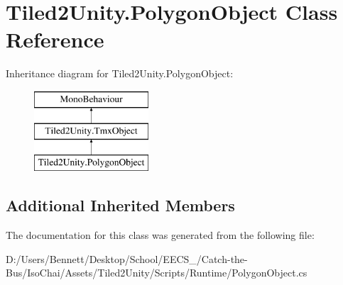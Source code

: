 \hypertarget{class_tiled2_unity_1_1_polygon_object}{}\section{Tiled2\+Unity.\+Polygon\+Object Class Reference}
\label{class_tiled2_unity_1_1_polygon_object}
Inheritance diagram for Tiled2\+Unity.\+Polygon\+Object\+:\begin{figure}[H]
\begin{center}
\leavevmode
\includegraphics[height=3.000000cm]{class_tiled2_unity_1_1_polygon_object}
\end{center}
\end{figure}
\subsection*{Additional Inherited Members}


The documentation for this class was generated from the following file\+:\begin{DoxyCompactItemize}
\item 
D\+:/\+Users/\+Bennett/\+Desktop/\+School/\+E\+E\+C\+S\+\_/\+Catch-\/the-\/\+Bus/\+Iso\+Chai/\+Assets/\+Tiled2\+Unity/\+Scripts/\+Runtime/Polygon\+Object.\+cs\end{DoxyCompactItemize}
